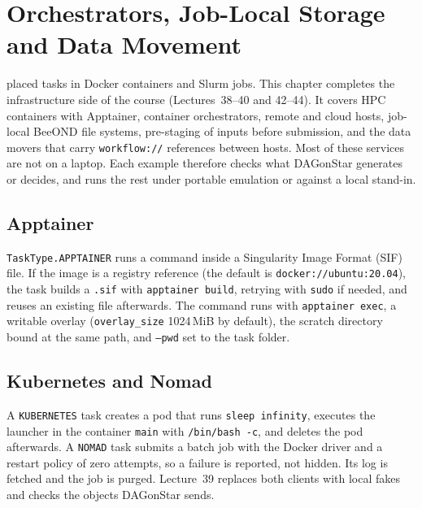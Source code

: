 \chapter{Orchestrators, Job-Local Storage and Data Movement}
\label{ch:hpc-storage}

 placed tasks in Docker containers and Slurm jobs. This
chapter completes the infrastructure side of the course (Lectures~38--40 and
42--44). It covers HPC containers with Apptainer, container orchestrators,
remote and cloud hosts, job-local BeeOND file systems, pre-staging of inputs
before submission, and the data movers that carry \texttt{workflow://}
references between hosts. Most of these services are not on a laptop. Each
example therefore checks what DAGonStar generates or decides, and runs the
rest under portable emulation or against a local stand-in.

\section{Apptainer}

\texttt{TaskType.APPTAINER} runs a command inside a Singularity Image Format
(SIF) file. If the image is a registry reference (the default is
\texttt{docker://ubuntu:20.04}), the task builds a \texttt{.sif} with
\texttt{apptainer build}, retrying with \texttt{sudo} if needed, and reuses an
existing file afterwards. The command runs with \texttt{apptainer exec}, a
writable overlay (\texttt{overlay\_size} 1024\,MiB by default), the scratch
directory bound at the same path, and \texttt{--pwd} set to the task folder.





\section{Kubernetes and Nomad}

A \texttt{KUBERNETES} task creates a pod that runs \texttt{sleep infinity},
executes the launcher in the container \texttt{main} with
\texttt{/bin/bash -c}, and deletes the pod afterwards. A \texttt{NOMAD} task
submits a batch job with the Docker driver and a restart policy of zero
attempts, so a failure is reported, not hidden. Its log is fetched and the job
is purged. Lecture~39 replaces both clients with local fakes and checks the
objects DAGonStar sends.

